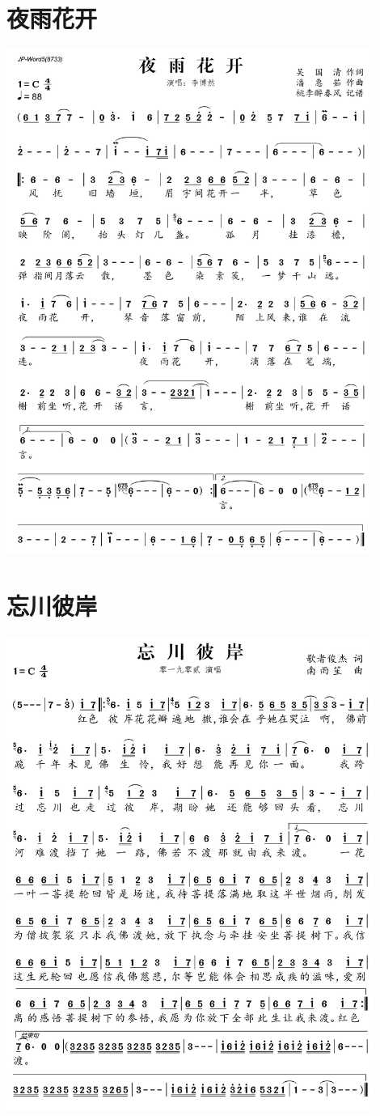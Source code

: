\documentclass[cn,pad,twocol]{elegantbook}
\begin{document}
\section{夜雨花开} \includegraphics[width=0.9\textwidth]{macos/2020夜雨花开.png}
\section{忘川彼岸} \includegraphics[width=0.9\textwidth]{macos/2020忘川彼岸.png}
\end{document}
